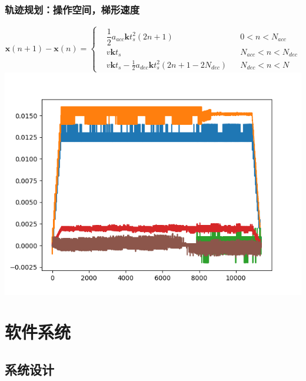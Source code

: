 \documentclass{beamer}
\begin{document}
\begin{frame}
    \frametitle{轨迹规划：操作空间，梯形速度}
    \[
        \mathbf x(n+1)- \mathbf x(n) = \left\{\begin{aligned}
             & \dfrac{1}{2} a_{acc} \mathbf k t_s^2(2n+1)                      &  & 0<n<N_{acc}       \\
             & v\mathbf kt_s                                                   &  & N_{acc}<n<N_{dec} \\
             & v \mathbf k t_s-\frac{1}{2} a_{dec} \mathbf k t_s^2(2n+1-2N_{dec}) &  & N_{dec}<n<N
        \end{aligned}\right.
    \]
    \centering
    \includegraphics[scale=0.32]{轨迹规划.png}
\end{frame}


\section{软件系统}

\subsection{系统设计}
\end{document}
